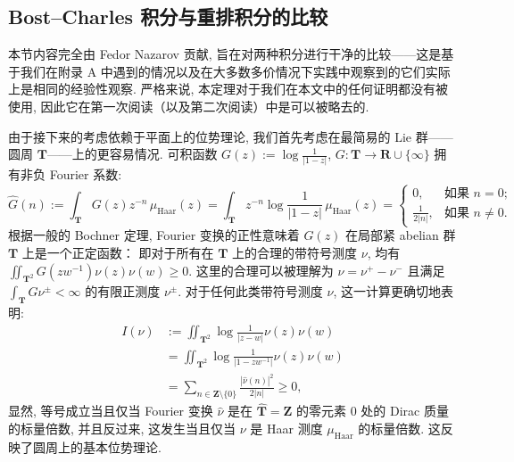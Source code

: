 \subsection{Bost--Charles 积分与重排积分的比较}\label{sec:8.1}

本节内容完全由 Fedor Nazarov 贡献, 旨在对两种积分进行干净的比较——这是基于我们在附录 A 中遇到的情况以及在大多数多价情况下实践中观察到的它们实际上是相同的经验性观察. 
严格来说, 本定理对于我们在本文中的任何证明都没有被使用, 
因此它在第一次阅读（以及第二次阅读）中是可以被略去的.

\begin{remark}\label{rem:8.1.1}
由于接下来的考虑依赖于平面上的位势理论, 我们首先考虑在最简易的 Lie 群——圆周 \(\mathbf{T}\)——上的更容易情况. 
可积函数 \(G(z) := \log \frac{1}{|1-z|}\), \(G: \mathbf{T} \to \mathbf{R} \cup \{\infty\}\) 拥有非负 Fourier 系数:
\begin{equation}\label{eq:8.1.2}
\widehat{G}(n) := \int_{\mathbf{T}} G(z) z^{-n} \, \mu_{\text{Haar}}(z) = \int_{\mathbf{T}} z^{-n} \log \frac{1}{|1 - z|} \, \mu_{\text{Haar}}(z) = \begin{cases} 0, & \text{如果 } n = 0; \\ \frac{1}{2|n|}, & \text{如果 } n \neq 0. \end{cases}
\end{equation}
根据一般的 Bochner 定理, Fourier 变换的正性意味着 \(G(z)\) 在局部紧 abelian 群 \(\mathbf{T}\) 上是一个正定函数： 
即对于所有在 \(\mathbf{T}\) 上的合理的带符号测度 \(\nu\), 均有 \(\iint_{\mathbf{T}^2} G(zw^{-1}) \nu(z) \nu(w) \geq 0\). 
这里的合理可以被理解为 \(\nu = \nu^+ - \nu^-\) 且满足 \(\int_{\mathbf{T}} G \nu^\pm < \infty\) 的有限正测度 \(\nu^\pm\). 
对于任何此类带符号测度 \(\nu\), 这一计算更确切地表明:
\begin{equation}\label{eq:8.1.3}
\begin{aligned}
I(\nu) &:= \iint_{\mathbf{T}^2} \log \frac{1}{|z - w|} \nu(z) \nu(w) \\
&= \iint_{\mathbf{T}^2} \log \frac{1}{|1 - zw^{-1}|} \nu(z) \nu(w) \\
&= \sum_{n \in \mathbf{Z} \setminus \{0\}} \frac{|\widehat{\nu}(n)|^2}{2|n|} \ge 0,
\end{aligned}
\end{equation}
显然, 等号成立当且仅当 Fourier 变换 \(\widehat{\nu}\) 是在 \(\widehat{\mathbf{T}} = \mathbf{Z}\) 的零元素 \(0\) 处的 Dirac 质量的标量倍数, 
并且反过来, 这发生当且仅当 \(\nu\) 是 Haar 测度 \(\mu_{\text{Haar}}\) 的标量倍数. 
这反映了圆周上的基本位势理论. \end{remark}

